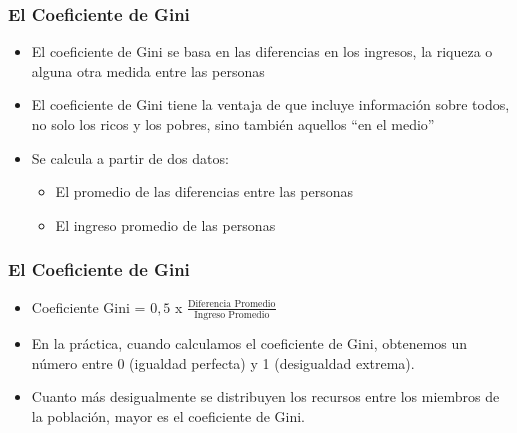 \documentclass{beamer}
\begin{document}
\begin{frame} 
\frametitle{El Coeficiente de Gini}
\begin{itemize}
\item El coeficiente de Gini se basa en las diferencias en los ingresos, la riqueza o alguna otra medida entre las personas
\item El coeficiente de Gini tiene la ventaja de que incluye información sobre todos, no solo los ricos y los pobres, sino también aquellos ``en el medio''
\item Se calcula a partir de dos datos:
        \begin{itemize}
            \item El promedio de las diferencias entre las personas
            \item El ingreso promedio de las personas
        \end{itemize}
\end{itemize}
\end{frame}

\begin{frame} 
\frametitle{El Coeficiente de Gini}
\begin{itemize}
\item Coeficiente Gini = $0,5$ x  $\frac{\text{Diferencia Promedio}}{\text{Ingreso Promedio}}$
\item En la práctica, cuando calculamos el coeficiente de Gini, obtenemos un número entre 0 (igualdad perfecta) y 1 (desigualdad extrema). 
\item Cuanto más desigualmente se distribuyen los recursos entre los miembros de la población, mayor es el coeficiente de Gini.
\end{itemize}
\end{frame}
\end{document}
